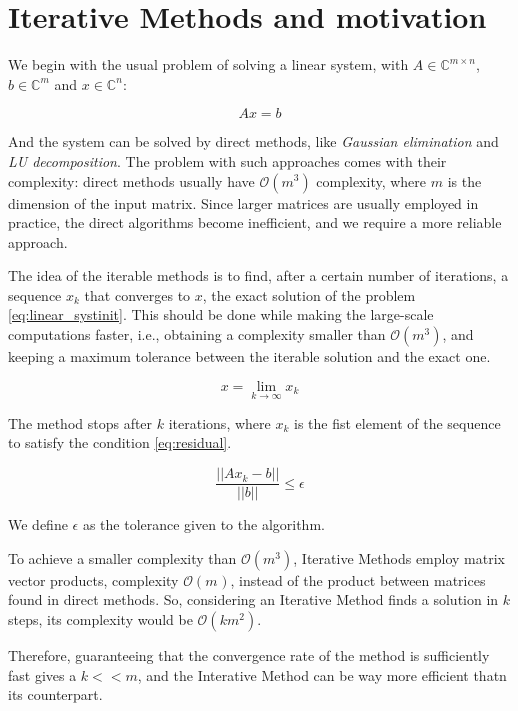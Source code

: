 \section{Iterative Methods and motivation}

We begin with the usual problem of solving a linear system, with $A \in \mathbb{C}^{m \times n}$, $b \in \mathbb{C}^{m}$ and $x\in \mathbb{C}^{n}$:

\begin{equation}\label{eq:linear_systinit}
    Ax=b
\end{equation}

And the system can be solved by direct methods, like \textit{Gaussian elimination} and \textit{LU decomposition}. The problem with such approaches comes with their complexity: direct methods usually have $\mathcal{O}(m^{3})$ complexity, where $m$ is the dimension of the input matrix. Since larger matrices are usually employed in practice, the direct algorithms become inefficient, and we require a more reliable approach.


The idea of the iterable methods is to find, after a certain number of iterations, a sequence ${x_{k}}$ that converges to $x$, the exact solution of the problem \ref{eq:linear_systinit}. This should be done while making the large-scale computations faster, i.e., obtaining a complexity smaller than $\mathcal{O}(m^{3})$, and keeping a maximum tolerance between the iterable solution and the exact one.


\begin{equation}\label{eq:suite}
    x = \lim_{k \to \infty} x_{k}
\end{equation}


The method stops after $k$ iterations, where $x_{k}$ is the fist element of the sequence to satisfy the condition \ref{eq:residual}.

\begin{equation}\label{eq:residual}
    \frac{||Ax_{k} - b||}{||b||} \leq \epsilon
\end{equation}

We define $\epsilon$ as the tolerance given to the algorithm.

To achieve a smaller complexity than $\mathcal{O}(m^{3})$, Iterative Methods employ matrix vector products, complexity $\mathcal{O}(m^{})$, instead of the product between matrices found in direct methods. So, considering an Iterative Method finds a solution in $k$ steps, its complexity would be $\mathcal{O}(km^{2})$.

Therefore, guaranteeing that the convergence rate of the method is sufficiently fast gives a $k << m$, and the Interative Method can be way more efficient thatn its counterpart.

